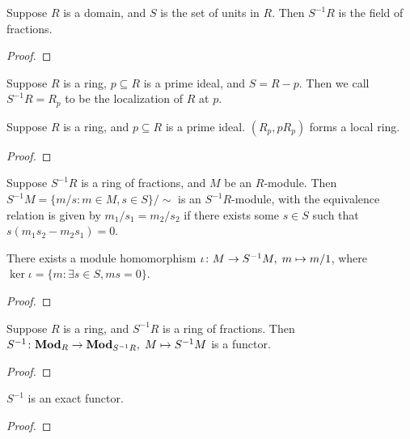 \begin{proposition}
    Suppose \(R\) is a domain, and \(S\) is the set of units in \(R\).
    Then \(S^{-1}R\) is the field of fractions.
\end{proposition}
\begin{proof}
    
\end{proof}

\begin{definition}
    Suppose \(R\) is a ring, \(p \subseteq R\) is a prime ideal,
    and \(S = R - p\).
    Then we call \(S^{-1}R = R_p\) to be the localization of \(R\) at \(p\).
\end{definition}
\begin{proposition}
    Suppose \(R\) is a ring, and \(p \subseteq R\) is a prime ideal.
    \((R_p,pR_p)\) forms a local ring.
\end{proposition}
\begin{proof}
    
\end{proof}

\begin{definition}
    Suppose \(S^{-1}R\) is a ring of fractions, and \(M\) be an \(R\)-module.
    Then \(S^{-1}M = \{m/s : m \in M, s \in S\}/{\sim}\) is an \(S^{-1}R\)-module,
    with the equivalence relation is given by \(m_1/s_1 = m_2/s_2\)
    if there exists some \(s \in S\) such that \(s(m_1s_2 - m_2s_1) = 0\).
\end{definition}
\begin{proposition}
    There exists a module homomorphism \(\iota\colon M\to S^{-1}M,\;m\mapsto m/1\),
    where \(\ker\iota = \{m : \exists s \in S, ms = 0\}\).
\end{proposition}
\begin{proof}
    
\end{proof}

\begin{proposition}
    Suppose \(R\) is a ring, and \(S^{-1}R\) is a ring of fractions.
    Then \(S^{-1}\colon\textbf{Mod}_R\to\textbf{Mod}_{S^{-1}R},\;M\mapsto S^{-1}M\)
    is a functor.
\end{proposition}
\begin{proof}
    
\end{proof}
\begin{theorem}
    \(S^{-1}\) is an exact functor.
\end{theorem}
\begin{proof}
    
\end{proof}

